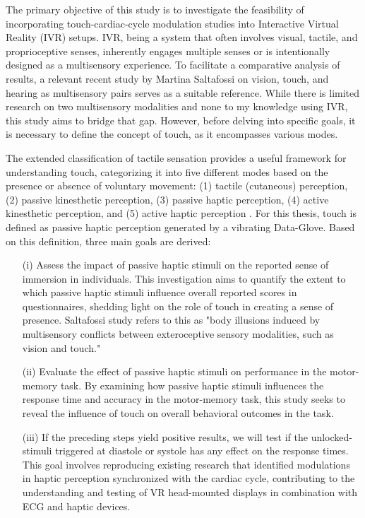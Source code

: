 \documentclass[12pt,oneside,openright]{report}
\begin{document}
The primary objective of this study is to investigate the feasibility of incorporating touch-cardiac-cycle modulation studies into Interactive Virtual Reality (IVR) setups. IVR, being a system that often involves visual, tactile, and proprioceptive senses, inherently engages multiple senses or is intentionally designed as a multisensory experience. To facilitate a comparative analysis of results, a relevant recent study by Martina Saltafossi on vision, touch, and hearing as multisensory pairs \cite{SALTAFOSSI2023108642} serves as a suitable reference. While there is limited research on two multisensory modalities and none to my knowledge using IVR, this study aims to bridge that gap. However, before delving into specific goals, it is necessary to define the concept of touch, as it encompasses various modes.

The extended classification of tactile sensation \cite{Healy2003HandbookOP} provides a useful framework for understanding touch, categorizing it into five different modes based on the presence or absence of voluntary movement: (1) tactile (cutaneous) perception, (2) passive kinesthetic perception, (3) passive haptic perception, (4) active kinesthetic perception, and (5) active haptic perception . For this thesis, touch is defined as passive haptic perception generated by a vibrating Data-Glove. Based on this definition, three main goals are derived:

\begin{itemize}
    \item[(i)] Assess the impact of passive haptic stimuli on the reported sense of immersion in individuals. This investigation aims to quantify the extent to which passive haptic stimuli influence overall reported scores in questionnaires, shedding light on the role of touch in creating a sense of presence. Saltafossi study refers to this as "body illusions induced by multisensory conflicts between exteroceptive sensory modalities, such as vision and touch."
    
    \item[(ii)] Evaluate the effect of passive haptic stimuli on performance in the motor-memory task. By examining how passive haptic stimuli influences the response time and accuracy in the motor-memory task, this study seeks to reveal the influence of touch on overall behavioral outcomes in the task. 
    
    \item[(iii)] If the preceding steps yield positive results, we will test if the unlocked-stimuli triggered at diastole or systole has any effect on the response times. This goal involves reproducing existing research that identified modulations in haptic perception synchronized with the cardiac cycle, contributing to the understanding and testing of VR head-mounted displays in combination with ECG and haptic devices.
\end{itemize}
\end{document}
